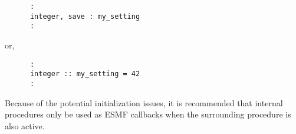 \begin{verbatim}
      :
      integer, save : my_setting
      :
\end{verbatim}

or,

\begin{verbatim}
      :
      integer :: my_setting = 42
      :
\end{verbatim}

Because of the potential initialization issues, it is recommended that internal procedures
only be used as ESMF callbacks when the surrounding procedure is also active.

